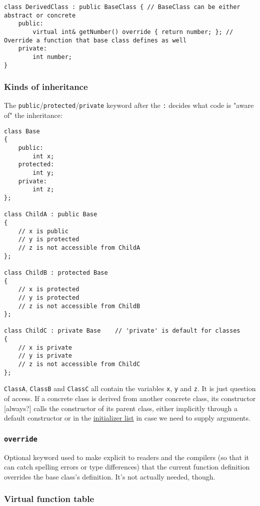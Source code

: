 \documentclass[8pt, table, xcdraw]{article}%
\begin{document}
\begin{lstlisting}
class DerivedClass : public BaseClass { // BaseClass can be either abstract or concrete
    public:
        virtual int& getNumber() override { return number; }; // Override a function that base class defines as well
    private:
        int number;
}
\end{lstlisting}

\subsubsection{Kinds of inheritance}

The \lstinline{public}/\lstinline{protected}/\lstinline{private} keyword after the \lstinline{:} decides what code is "aware of" the inheritance:

\begin{lstlisting}
class Base
{
    public:
        int x;
    protected:
        int y;
    private:
        int z;
};

class ChildA : public Base
{
    // x is public
    // y is protected
    // z is not accessible from ChildA
};

class ChildB : protected Base
{
    // x is protected
    // y is protected
    // z is not accessible from ChildB
};

class ChildC : private Base    // 'private' is default for classes
{
    // x is private
    // y is private
    // z is not accessible from ChildC
};
\end{lstlisting}

\lstinline{ClassA}, \lstinline{ClassB} and \lstinline{ClassC} all contain the variables \lstinline{x}, \lstinline{y} and \lstinline{z}. It is just question of access. If a concrete class is derived from another concrete class, its constructor [always?] calls the constructor of its parent class, either implicitly through a default constructor or in the \hyperref[initializerlist]{initializer list} in case we need to supply arguments.

\subsubsection{\lstinline{override}}

Optional keyword used to make explicit to readers and the compilers (so that it can catch spelling errors or type differences) that the current function definition overrides the base class's definition. It's not actually needed, though.

\subsubsection{Virtual function table}
\end{document}
